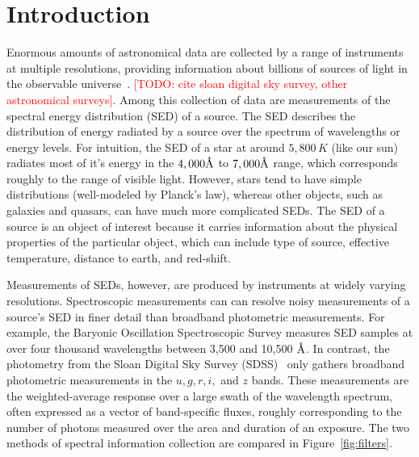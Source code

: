 \documentclass{article}
\newcommand{\angstrom}{\textup{\AA}}
\newcommand{\red}[1]{\textcolor{red}{[TODO: #1]}}
\begin{document}
\section{Introduction}
Enormous amounts of astronomical data are collected by a range of instruments at multiple resolutions, providing information about billions of sources of light in the observable universe~\cite{kent1994sdss}. \red{cite sloan digital sky survey, other astronomical surveys}.  
Among this collection of data are measurements of the spectral energy distribution (SED) of a source.  
The SED describes the distribution of energy radiated by a source over the spectrum of wavelengths or energy levels.  
For intuition, the SED of a star at around $5,800\, K$ (like our sun) radiates most of it's energy in the $4,000 \angstrom$ to $7,000\angstrom$ range, which corresponds roughly to the range of visible light.  
However, stars tend to have simple distributions (well-modeled by Planck's law), whereas other objects, such as galaxies and quasars, can have much more complicated SEDs.  
The SED of a source is an object of interest because it carries information about the physical properties of the particular object, which can include type of source, effective temperature, distance to earth, and red-shift. 

Measurements of SEDs, however, are produced by instruments at widely varying resolutions.  
Spectroscopic measurements can can resolve noisy measurements of a source's SED in finer detail than broadband photometric measurements.  For example, the Baryonic Oscillation Spectroscopic Survey \cite{dawson2013baryon} measures SED samples at over four thousand wavelengths between 3,500 and 10,500 $\angstrom$.  
In contrast, the photometry from the Sloan Digital Sky Survey (SDSS)~\cite{kent1994sdss} only gathers broadband photometric measurements in the $u,g,r,i,$ and $z$ bands.  These measurements are the weighted-average response over a large swath of the wavelength spectrum, often expressed as a vector of band-specific fluxes, roughly corresponding to the number of photons measured over the area and duration of an exposure.  
The two methods of spectral information collection are compared in Figure~\ref{fig:filters}. 
\end{document}

